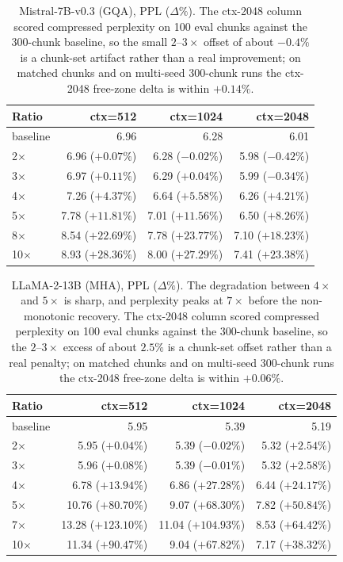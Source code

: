 \documentclass{article}
\begin{document}
\begin{table}[htbp]
  \centering
  \caption{Mistral-7B-v0.3 (GQA), PPL ($\Delta\%$). The ctx-2048 column scored compressed perplexity on 100 eval chunks against the 300-chunk baseline, so the small $2$--$3\times$ offset of about $-0.4\%$ is a chunk-set artifact rather than a real improvement; on matched chunks and on multi-seed 300-chunk runs the ctx-2048 free-zone delta is within $+0.14\%$.}
  \begin{tabular}{lrrr}
    \toprule
    Ratio & ctx=512 & ctx=1024 & ctx=2048 \\
    \midrule
    baseline & 6.96 & 6.28 & 6.01 \\
    2$\times$ & 6.96 ($+0.07\%$) & 6.28 ($-0.02\%$) & 5.98 ($-0.42\%$) \\
    3$\times$ & 6.97 ($+0.11\%$) & 6.29 ($+0.04\%$) & 5.99 ($-0.34\%$) \\
    4$\times$ & 7.26 ($+4.37\%$) & 6.64 ($+5.58\%$) & 6.26 ($+4.21\%$) \\
    5$\times$ & 7.78 ($+11.81\%$) & 7.01 ($+11.56\%$) & 6.50 ($+8.26\%$) \\
    8$\times$ & 8.54 ($+22.69\%$) & 7.78 ($+23.77\%$) & 7.10 ($+18.23\%$) \\
    10$\times$ & 8.93 ($+28.36\%$) & 8.00 ($+27.29\%$) & 7.41 ($+23.38\%$) \\
    \bottomrule
  \end{tabular}
\end{table}

\begin{table}[htbp]
  \centering
  \caption{LLaMA-2-13B (MHA), PPL ($\Delta\%$). The degradation between $4\times$ and $5\times$ is sharp, and perplexity peaks at $7\times$ before the non-monotonic recovery. The ctx-2048 column scored compressed perplexity on 100 eval chunks against the 300-chunk baseline, so the $2$--$3\times$ excess of about $2.5\%$ is a chunk-set offset rather than a real penalty; on matched chunks and on multi-seed 300-chunk runs the ctx-2048 free-zone delta is within $+0.06\%$.}
  \begin{tabular}{lrrr}
    \toprule
    Ratio & ctx=512 & ctx=1024 & ctx=2048 \\
    \midrule
    baseline & 5.95 & 5.39 & 5.19 \\
    2$\times$ & 5.95 ($+0.04\%$) & 5.39 ($-0.02\%$) & 5.32 ($+2.54\%$) \\
    3$\times$ & 5.96 ($+0.08\%$) & 5.39 ($-0.01\%$) & 5.32 ($+2.58\%$) \\
    4$\times$ & 6.78 ($+13.94\%$) & 6.86 ($+27.28\%$) & 6.44 ($+24.17\%$) \\
    5$\times$ & 10.76 ($+80.70\%$) & 9.07 ($+68.30\%$) & 7.82 ($+50.84\%$) \\
    7$\times$ & 13.28 ($+123.10\%$) & 11.04 ($+104.93\%$) & 8.53 ($+64.42\%$) \\
    10$\times$ & 11.34 ($+90.47\%$) & 9.04 ($+67.82\%$) & 7.17 ($+38.32\%$) \\
    \bottomrule
  \end{tabular}
\end{table}
\end{document}
